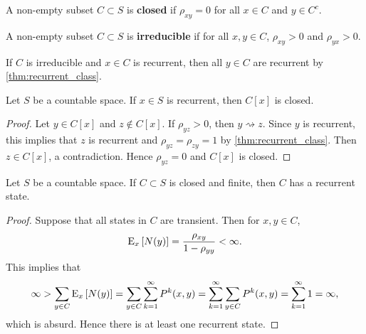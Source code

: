 \begin{definition}
    A non-empty subset $C\subset S$ is \textbf{closed} if $\rho_{xy} = 0$ 
    for all $x\in C$ and $y\in C^c$. 
\end{definition}

\begin{definition}
    A non-empty subset $C\subset S$ is \textbf{irreducible} if for all $x,y\in C$, 
    $\rho_{xy}>0$ and $\rho_{yx}>0$. 
\end{definition}
\begin{remark}
    If $C$ is irreducible and $x\in C$ is recurrent, then all $y\in C$ 
    are recurrent by \cref{thm:recurrent_class}. 
\end{remark}

\begin{proposition}
    Let $S$ be a countable space. If $x\in S$ is recurrent, then $C[x]$ is closed. 
\end{proposition}
\begin{proof}
    Let $y\in C[x]$ and $z\notin C[x]$. If $\rho_{yz} > 0$, then $y\rightsquigarrow z$. 
    Since $y$ is recurrent, this implies that $z$ is recurrent and $\rho_{yz} = \rho_{zy} = 1$ 
    by \cref{thm:recurrent_class}. Then $z\in C[x]$, a contradiction. 
    Hence $\rho_{yz} = 0$ and $C[x]$ is closed. 
\end{proof}

\begin{proposition}\label{prop:recurrent_closed}
    Let $S$ be a countable space. If $C\subset S$ is closed and finite, then 
    $C$ has a recurrent state.  
\end{proposition}
\begin{proof}
    Suppose that all states in $C$ are transient. Then for $x,y\in C$, 
    \begin{equation*}
        \operatorname{E}_x\left[ {N(y)} \right] = \frac{\rho_{xy}}{1-\rho_{yy}} < \infty. 
    \end{equation*}
    This implies that 
    \begin{equation*}
        \infty > \sum_{y\in C}\operatorname{E}_x\left[ {N(y)} \right] = \sum_{y\in C}\sum_{k=1}^\infty P^k(x,y) 
        = \sum_{k=1}^\infty\sum_{y\in C} P^k(x,y) = \sum_{k=1}^\infty 1 = \infty, 
    \end{equation*}
    which is absurd. Hence there is at least one recurrent state. 
\end{proof}


